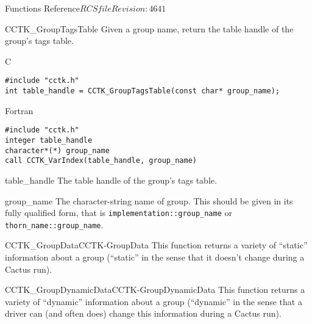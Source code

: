 \begin{cactuspart}{ Functions Reference}{$RCSfile$}{$Revision: 4641 $}
\begin{FunctionDescription}{CCTK\_GroupTagsTable}
\label{CCTK-GroupTagsTable}
Given a group name, return the table handle of the group's tags table.

\begin{SynopsisSection}
\begin{Synopsis}{C}
\begin{verbatim}
#include "cctk.h"
int table_handle = CCTK_GroupTagsTable(const char* group_name);
\end{verbatim}
\end{Synopsis}
\begin{Synopsis}{Fortran}
\begin{verbatim}
#include "cctk.h"
integer table_handle
character*(*) group_name
call CCTK_VarIndex(table_handle, group_name)
\end{verbatim}
\end{Synopsis}
\end{SynopsisSection}

\begin{ResultSection}
\begin{Result}{table\_handle}
The table handle of the group's tags table.
\end{Result}
\end{ResultSection}

\begin{ParameterSection}
\begin{Parameter}{group\_name}
The character-string name of group.  This should be given in its fully 
qualified form, that is \verb|implementation::group_name| or
\verb|thorn_name::group_name|.
\end{Parameter}
\end{ParameterSection}

\begin{SeeAlsoSection}
\begin{SeeAlso2}{CCTK\_GroupData}{CCTK-GroupData}
This function returns a variety of ``static'' information about a group
(``static'' in the sense that it doesn't change during a Cactus run).
\end{SeeAlso2}
\begin{SeeAlso2}{CCTK\_GroupDynamicData}{CCTK-GroupDynamicData}
This function returns a variety of ``dynamic'' information about a group
(``dynamic'' in the sense that a driver can (and often does) change this
information during a Cactus run).
\end{SeeAlso2}
\end{SeeAlsoSection}


\end{FunctionDescription}
\end{cactuspart}
